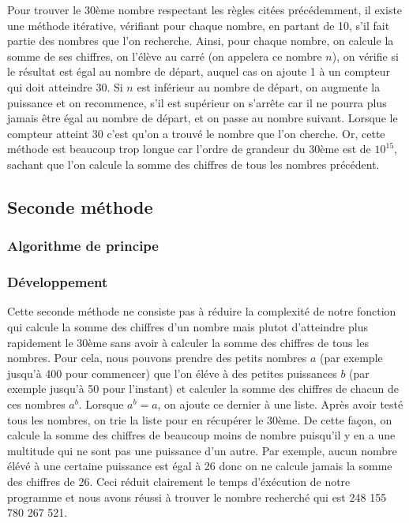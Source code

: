 \documentclass{article}
\newcommand{\code}[3]{}
\begin{document}
Pour trouver le 30ème nombre respectant les règles citées précédemment, il existe une méthode itérative, vérifiant pour chaque nombre, en partant de 10, s'il fait partie des nombres que l'on recherche. Ainsi, pour chaque nombre, on calcule la somme de ses chiffres, on l'élève au carré (on appelera ce nombre $n$), on vérifie si le résultat est égal au nombre de départ, auquel cas on ajoute 1 à un compteur qui doit atteindre 30. Si $n$ est inférieur au nombre de départ, on augmente la puissance et on recommence, s'il est supérieur on s'arrête car il ne pourra plus jamais être égal au nombre de départ, et on passe au nombre suivant. Lorsque le compteur atteint 30 c'est qu'on a trouvé le nombre que l'on cherche. Or, cette méthode est beaucoup trop longue car l'ordre de grandeur du 30ème est de $10^{15}$, sachant que l'on calcule la somme des chiffres de tous les nombres précédent.


\subsection{Seconde méthode}

\subsubsection{Algorithme de principe}
\code{1}{11}{problem119_2_principe.txt}

\subsubsection{Développement}
Cette seconde méthode ne consiste pas à réduire la complexité de notre fonction qui calcule la somme des chiffres d'un nombre mais plutot d'atteindre plus rapidement le 30ème sans avoir à calculer la somme des chiffres de tous les nombres. Pour cela, nous pouvons prendre des petits nombres $a$ (par exemple jusqu'à 400 pour commencer) que l'on éléve à des petites puissances $b$ (par exemple jusqu'à 50 pour l'instant) et calculer la somme des chiffres de chacun de ces nombres $a^{b}$. Lorsque $a^{b} = a$, on ajoute ce dernier à une liste. Après avoir testé tous les nombres, on trie la liste pour en récupérer le 30ème. De cette façon, on calcule la somme des chiffres de beaucoup moins de nombre puisqu'il y en a une multitude qui ne sont pas une puissance d'un autre. Par exemple, aucun nombre élévé à une certaine puissance est égal à 26 donc on ne calcule jamais la somme des chiffres de 26. Ceci réduit clairement le temps d'éxécution de notre programme et nous avons réussi à trouver le nombre recherché qui est 248 155 780 267 521.
\end{document}

